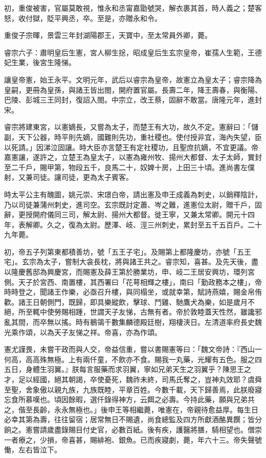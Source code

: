 \begin{pinyinscope}
 初，重俊被害，官屬莫敢視，惟永和丞甯嘉勖號哭，解衣裹其首，時人義之；楚客怒，收付獄，貶平興丞，卒。至是，亦贈永和令。



 重俊子宗暉，景雲三年封湖陽郡王，天寶中，至太常員外卿，薨。



 睿宗六子：肅明皇后生憲，宮人柳生捴，昭成皇后生玄宗皇帝，崔孺人生範，王德妃生業，後宮生隆悌。



 讓皇帝憲，始王永平。文明元年，武后以睿宗為皇帝，故憲立為皇太子；睿宗降為皇嗣，更冊為皇孫，與諸王皆出閤，開府置官屬。長壽二年，降王壽春，與衡陽、巴陵、彭城三王同封，復詔入閤。中宗立，改王蔡，固辭不敢當。唐隆元年，進封宋。



 睿宗將建東宮，以憲嫡長，又嘗為太子，而楚王有大功，故久不定。憲辭曰：「儲副，天下公器，時平則先嫡，國難則先功，重社稷也。使付授非宜，海內失望，臣以死請。」因涕泣固讓。時大臣亦言楚王有定社稷功，且聖庶抗嫡，不宜更議。帝嘉憲讓，遂許之，立楚王為皇太子，以憲為雍州牧、揚州大都督、太子太師，實封至二千戶，賜甲第，物段五千，良馬二十，奴婢十房，上田三十頃。進尚書左僕射，又兼司徒。讓司徒，更為太子賓客。



 時太平公主有醜圖，姚元崇、宋璟白帝，請出憲及申王成義為刺史，以銷釋陰計，乃以司徒兼蒲州刺史，進司空。玄宗既討定蕭、岑之難，進憲位太尉，贈千戶，固辭，更授開府儀同三司，解太尉、揚州大都督。徙王寧，又兼太常卿。開元十四年，表解卿。久之，復為太尉。歷澤、岐、涇三州刺史，累封至五千五百戶。二十九年薨。



 初，帝五子列第東都積善坊，號「五王子宅」。及賜第上都隆慶坊，亦號「五王宅」。玄宗為太子，嘗制大衾長枕，將與諸王共之。睿宗知，喜甚。及先天後，盡以隆慶舊邸為興慶宮，而賜憲及薛王第於勝業坊，申、岐二王居安興坊，環列宮側。天子於宮西、南置樓，其西署曰「花萼相輝之樓」，南曰「勤政務本之樓」，帝時時登之，聞諸王作樂，必亟召升樓，與同榻坐，或就幸第，賦詩燕嬉，賜金帛侑歡。諸王日朝側門，既歸，即具樂縱飲，擊球、鬥雞、馳鷹犬為樂，如是歲月不絕，所至輒中使勞賜相踵，世謂天子友悌，古無有者。帝於敦睦蓋天性然，雖讒邪亂其間，而卒無以搖。時有鶺鴒千數集麟德殿廷樹，翔棲浹日。左清道率府長史魏光乘作頌，以為天子友悌之祥。帝喜，亦為作頌。



 憲尤謹畏，未嘗干政而與人交，帝益信重，嘗以書賜憲等曰：「魏文帝詩：『西山一何高，高高殊無極。上有兩仟童，不飲亦不食。賜我一丸藥，光耀有五色。服之四五日，身體生羽翼。』朕每言服藥而求羽翼，寧如兄弟天生之羽翼乎？陳思王之才，足以經國，絕其朝謁，卒使憂死，魏祚未終，司馬氏奪之，豈神丸效耶？虞舜至聖，舍象傲以親九族，九族既睦，平章百姓。今數千載，天下歸善焉，此朕廢寢忘食所慕嘆也。頃因餘暇，選仟錄得神方，云餌之必壽。今持此藥，願與兄弟共之，偕至長齡，永永無極也。」後申王等相繼薨，唯憲在，帝親待愈益厚。每生日必幸其第為壽，往往留宿；居常無日不賜遺，尚食總監及四方所獻酒酪異饌；皆分餉之。憲嘗請歲盡錄賜目付史官，必數百紙。後有疾，護醫將膳，騎相望也。僧崇一者療之，少損，帝喜甚，賜緋袍、銀魚。已而疾寢劇，薨，年六十三。帝失聲號慟，左右皆泣下。




\end{pinyinscope}
